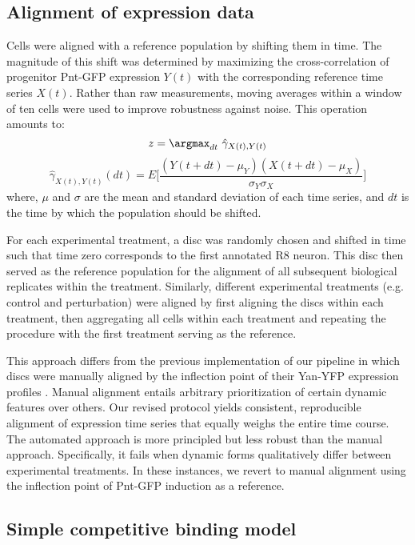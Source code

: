 \subsection{Alignment of expression data}

Cells were aligned with a reference population by shifting them in time. The magnitude of this shift was determined by maximizing the cross-correlation of progenitor Pnt-GFP expression $Y(t)$ with the corresponding reference time series $X(t)$. Rather than raw measurements, moving averages within a window of ten cells were used to improve robustness against noise. This operation amounts to:
\begin{equation}
z = \argmax_{dt} \ {\hat{\gamma}_{X(t),Y(t)}}
\end{equation}
\begin{equation}
\hat{\gamma}_{X(t),Y(t)} (dt) = E \Big[ \frac{(Y(t+dt)-\mu_Y)(X(t+dt)-\mu_X)}{\sigma_Y \sigma_X} \Big]
\end{equation}
where, $\mu$ and $\sigma$ are the mean and standard deviation of each time series, and $dt$ is the time by which the population should be shifted.

For each experimental treatment, a disc was randomly chosen and shifted in time such that time zero corresponds to the first annotated R8 neuron. This disc then served as the reference population for the alignment of all subsequent biological replicates within the treatment. Similarly, different experimental treatments (e.g. control and perturbation) were aligned by first aligning the discs within each treatment, then aggregating all cells within each treatment and repeating the procedure with the first treatment serving as the reference.

This approach differs from the previous implementation of our pipeline in which discs were manually aligned by the inflection point of their Yan-YFP expression profiles \cite{Pelaez2015}. Manual alignment entails arbitrary prioritization of certain dynamic features over others. Our revised protocol yields consistent, reproducible alignment of expression time series that equally weighs the entire time course. The automated approach is more principled but less robust than the manual approach. Specifically, it fails when dynamic forms qualitatively differ between experimental treatments. In these instances, we revert to manual alignment using the inflection point of Pnt-GFP induction as a reference.

\subsection{Simple competitive binding model}

